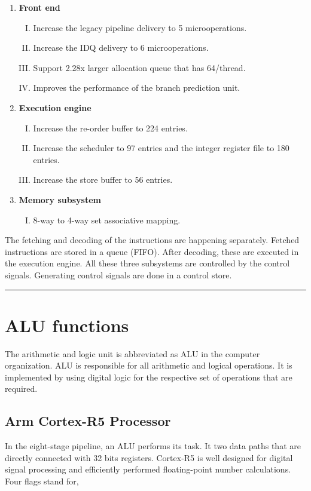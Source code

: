 \documentclass[a4paper,11pt]{article}
\begin{document}
 \begin{enumerate}[\hspace{1cm}1.]
 	\item \textbf{	Front end}
 	\begin{enumerate}[I.]
 		\item  	 Increase the legacy pipeline delivery to 5 microoperations.
 		\item Increase the IDQ delivery to 6 microoperations.
 		\item Support 2.28x larger allocation queue that has 64/thread.
 		\item Improves the performance of the branch prediction unit.
 	\end{enumerate}

 	\item\textbf{	Execution engine}
 	\begin{enumerate}[I.]
 		\item  	 Increase the re-order buffer to 224 entries.
 		\item Increase the scheduler to 97 entries and the integer register file to 180 entries.
 		\item Increase the store buffer to 56 entries.
 	\end{enumerate}

 	\item	\textbf{Memory subsystem}
 	\begin{enumerate}[I.]
 		\item 8-way to 4-way set associative mapping.
 	\end{enumerate}
 \end{enumerate}
The fetching and decoding of the instructions are happening separately. Fetched instructions are stored in a queue (FIFO). After decoding, these are executed in the execution engine. All these three subsystems are controlled by the control signals. Generating control signals are done in a control store.
\vspace{1cm}\hrule
\section{ALU functions}

The arithmetic and logic unit is abbreviated as ALU in the computer organization. ALU is responsible for all arithmetic and logical operations. It is implemented by using digital logic for the respective set of operations that are required.


\subsection{Arm Cortex-R5 Processor}
In the eight-stage pipeline, an ALU performs its task. It two data paths that are directly connected with 32 bits registers. Cortex-R5 is well designed for digital signal processing and efficiently performed floating-point number calculations. Four flags stand for,
\end{document}
